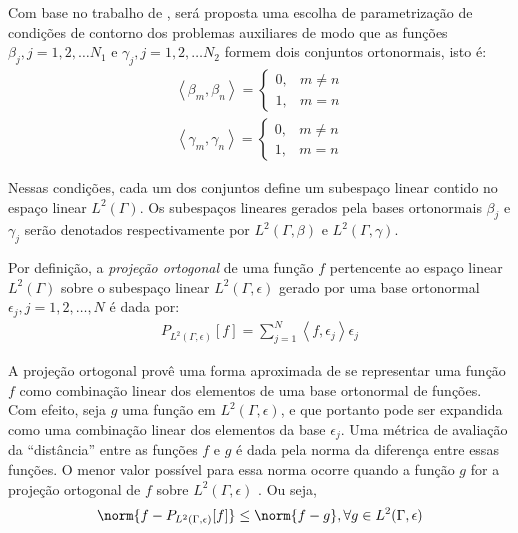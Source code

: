 Com base no trabalho de \cite{artigo_padilha_3}, será proposta uma escolha de parametrização de condições de contorno dos problemas auxiliares de modo que as funções
$\beta_j, j=1,2,\ldots N_1$ e $\gamma_j, j=1,2,\ldots N_2$ formem dois conjuntos ortonormais, isto é:
\begin{align}
	\left\langle  \beta_m, \beta_n \right\rangle = \left\lbrace
		\begin{matrix}
		0, & m \neq n \\
		1, & m = n 
		\end{matrix}
	\right.
\end{align}
\begin{align}
	\left\langle  \gamma_m, \gamma_n \right\rangle = \left\lbrace
		\begin{matrix}
		0, & m \neq n \\
		1, & m = n 
		\end{matrix}
	\right.
\end{align}

Nessas condições, cada um dos conjuntos define um subespaço linear contido no espaço linear $L^2(\Gamma)$. Os subespaços lineares gerados pela bases
ortonormais $\beta_j$ e $\gamma_j$ serão denotados respectivamente por $L^2(\Gamma, \beta)$ e $L^2(\Gamma, \gamma)$.

Por definição, a \textit{projeção ortogonal} de uma função $f$ pertencente ao espaço linear $L^2(\Gamma)$ sobre o subespaço linear $L^2(\Gamma, \epsilon)$
gerado por uma base ortonormal $\epsilon_j, j=1,2,\ldots,N$ é dada por:
\begin{align}
	P_{L^2(\Gamma, \epsilon)}[f] = \sum_{j=1}^N \left\langle f, \epsilon_j \right\rangle \epsilon_j
\end{align}

A projeção ortogonal provê uma forma aproximada de se representar uma função $f$ como combinação linear dos elementos de uma base ortonormal de
funções. Com efeito, seja $g$ uma função em $L^2(\Gamma, \epsilon)$, e que portanto pode ser expandida como uma combinação linear dos elementos da base $\epsilon_j$. Uma métrica de
avaliação da ``distância'' entre as funções $f$ e $g$ é dada pela norma da diferença entre essas funções. O menor valor possível para essa norma ocorre
quando a função $g$ for a projeção ortogonal de $f$ sobre $L^2(\Gamma, \epsilon)$ \citep{livro_axler}. Ou seja,
\begin{align}
	\norm{f - P_{L^2(\Gamma, \epsilon)}[f]} \le \norm{f - g}, \forall g \in L^2(\Gamma, \epsilon)
\end{align}

